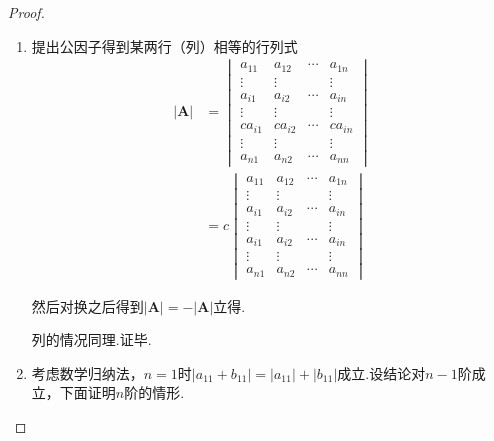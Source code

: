 {\begin{proof}
\begin{enumerate}[label = {\textup{(\arabic*)}}]
            \item 提出公因子得到某两行（列）相等的行列式\begin{align*}
                      \left|\bm{A}\right| & =\begin{vmatrix}
                                                 a_{11}  & a_{12}  & \cdots & a_{1n}  \\
                                                 \vdots  & \vdots  &        & \vdots  \\
                                                 a_{i1}  & a_{i2}  & \cdots & a_{in}  \\
                                                 \vdots  & \vdots  &        & \vdots  \\
                                                 ca_{i1} & ca_{i2} & \cdots & ca_{in} \\
                                                 \vdots  & \vdots  &        & \vdots  \\
                                                 a_{n1}  & a_{n2}  & \cdots & a_{nn}
                                             \end{vmatrix} \\
                                          & =c\begin{vmatrix}
                                                  a_{11} & a_{12} & \cdots & a_{1n} \\
                                                  \vdots & \vdots &        & \vdots \\
                                                  a_{i1} & a_{i2} & \cdots & a_{in} \\
                                                  \vdots & \vdots &        & \vdots \\
                                                  a_{i1} & a_{i2} & \cdots & a_{in} \\
                                                  \vdots & \vdots &        & \vdots \\
                                                  a_{n1} & a_{n2} & \cdots & a_{nn}
                                              \end{vmatrix}
                  \end{align*}

                  然后对换之后得到$\left|\bm{A}\right|=-\left|\bm{A}\right|$立得.

                  列的情况同理.证毕.
            \item 考虑数学归纳法，$n=1$时$\left|a_{11}+b_{11}\right|=\left|a_{11}\right|+\left|b_{11}\right|$成立.设结论对$n-1$阶成立，下面证明$n$阶的情形.


\end{enumerate}
\end{proof}}
